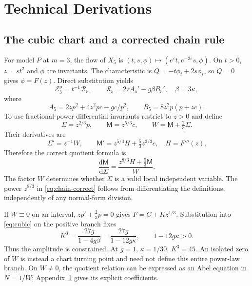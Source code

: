 \documentclass[11pt,a4paper,oneside]{report}
\numberwithin{equation}{chapter}
\newcommand{\E}{\mathcal E}
\newcommand{\R}{\mathcal R}
\newcommand{\dd}{\mathrm d}
\begin{document}
\chapter{Technical Derivations}\label{app:algebra}
\section{The cubic chart and a corrected chain rule}\label{sec:cubic}
For model $P$ at $m=3$, the flow of $X_5$ is
$(t,s,\phi)\mapsto(e^\varepsilon t,e^{-2\varepsilon}s,\phi)$.
On $t>0$, $z=st^2$ and $\phi$ are invariants. The characteristic is
$Q=-t\phi_t+2s\phi_s$, so $Q=0$ gives $\phi=F(z)$.
Direct substitution yields
\begin{equation}\label{eq:cubic}
\E_3^{\mathrm p}=t^{-1}\R_5,\qquad
\R_5=2zA_5'-g\beta B_5',\quad\beta=3\kappa,
\end{equation}
where
\begin{equation}
A_5=2zp^2+4z^2pc-gc/p^2,\qquad
B_5=8z^2p(p+zc).
\end{equation}
To use fractional-power differential invariants restrict to $z>0$ and define
\begin{equation}
\Sigma=z^{2/3}p,\qquad \mathsf M=z^{5/3}c,
\qquad W=\mathsf M+\tfrac23\Sigma.
\end{equation}
Their derivatives are
\begin{equation}
\Sigma'=z^{-1}W,\qquad
\mathsf M'=z^{5/3}H+\tfrac53z^{2/3}c,
\quad H=F'''(z).
\end{equation}
Therefore the correct quotient formula is
\begin{equation}\boxed{\displaystyle
\frac{\dd\mathsf M}{\dd\Sigma}
=\frac{z^{8/3}H+\tfrac53\mathsf M}{W}.}\label{eq:chain-correct}
\end{equation}
The factor $W$ determines whether $\Sigma$ is a valid local independent variable. The power $z^{8/3}$ in \eqref{eq:chain-correct} follows from differentiating the definitions, independently of any normal-form division.

If $W\equiv0$ on an interval, $zp'+\tfrac23p=0$ gives
$F=C+Kz^{1/3}$. Substitution into \eqref{eq:cubic} on the positive branch fixes
\begin{equation}\label{eq:power}
K^3=\frac{27g}{1-4g\beta}=\frac{27g}{1-12g\kappa},\qquad 1-12g\kappa>0.
\end{equation}
Thus the amplitude is constrained. At $g=1$, $\kappa=1/30$, $K^3=45$. An isolated zero of $W$ is instead a chart turning point and need not define this entire power-law branch. On $W\ne0$, the quotient relation can be expressed as an Abel equation in $N=1/W$; Appendix~\ref{app:algebra} gives its explicit coefficients.
\end{document}
